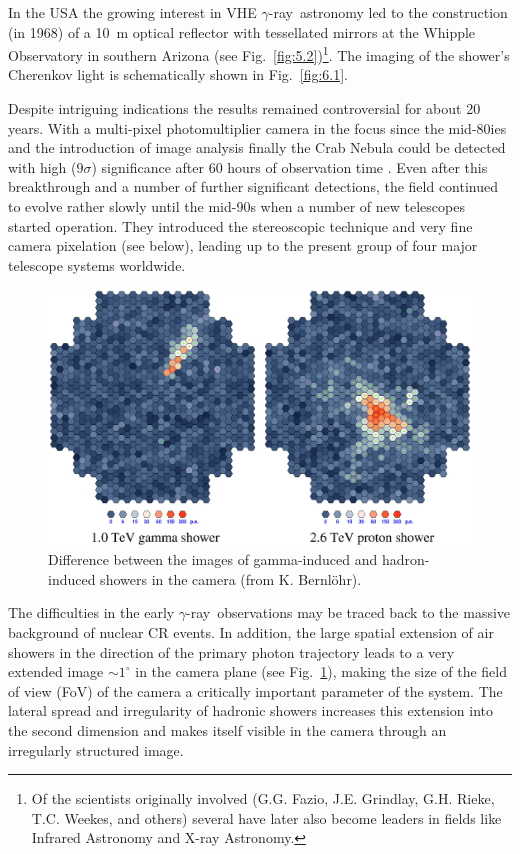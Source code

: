 \documentclass{svjour3x}                     %
\newcommand{\gr}{$\gamma$-ray}
\newcommand{\byKB}{ (from K. Bernl\"ohr)}
\begin{document}
In the USA the growing interest in VHE \gr\ astronomy led to the construction
(in 1968) of a 10~m optical reflector with tessellated mirrors at the Whipple
Observatory in southern Arizona (see Fig.~\ref{fig:5.2})\footnote{Of the
  scientists originally involved (G.G. Fazio, J.E. Grindlay, G.H. Rieke,
  T.C. Weekes, and others) several have later also become leaders in fields
  like Infrared Astronomy and X-ray Astronomy.}. The imaging of the shower's
Cherenkov light is schematically shown in Fig.~\ref{fig:6.1}.

Despite intriguing indications the results remained controversial for about 20
years. With a multi-pixel photomultiplier camera in the focus since the
mid-80ies and the introduction of image analysis finally the Crab Nebula could
be detected with high ($9 \sigma$) significance after 60 hours of observation
time \cite{weekes89}.  Even after this breakthrough and a number of further
significant detections, the field continued to evolve rather slowly until the
mid-90s when a number of new telescopes started operation. They introduced
the stereoscopic technique and very fine camera pixelation (see below), leading
up to the present group of four major telescope systems worldwide.

\begin{figure}
  \includegraphics[width=\textwidth]{Images.eps}
  \caption[Images of gamma-induced and hadron-induced
      showers]{Difference between the images of gamma-induced and hadron-induced
      showers in the camera\byKB.}
\label{fig:7}       %
\end{figure}
%

The difficulties in the early \gr\ observations may be traced back to the
massive background of nuclear CR events. In addition, the large spatial
extension of air showers in the direction of the primary photon trajectory
leads to a very extended image $\sim 1^{\circ}$ in the camera plane (see
Fig.~\ref{fig:7}), making the size of the field of view (FoV) of the camera a
critically important parameter of the system. The lateral spread and
irregularity of hadronic showers increases this extension into the second
dimension and makes itself visible in the camera through an irregularly
structured image.
\end{document}
